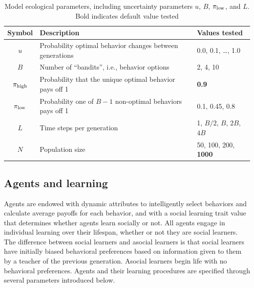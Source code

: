 \documentclass[letterpaper,11.5pt]{scrartcl}
\begin{document}
\vspace{2em}
\begin{table}[h]
\caption{Model ecological parameters, including uncertainty parameters $u$, $B$,
$\pi_{\mathrm{low}}$, and $L$. Bold indicates default value tested} %
    \label{tab:uncertaintyParameters}
    \centering %
    \begin{tabular}{cp{4.0in}p{1.25in}} \toprule

        Symbol & Description & Values tested \\ 

        \midrule  

        $u$    & Probability optimal behavior changes between generations 
               & 0.0, 0.1, \ldots, 1.0 \\

        $B$       & Number of ``bandits'', i.e., behavior options
                  & 2, 4, 10 \\

        $\pi_{\mathrm{high}}$ & Probability that the unique optimal behavior pays off 1 
                & \textbf{0.9} \\

        $\pi_{\mathrm{low}}$ & Probability one of $B - 1$ non-optimal behaviors pays off 1 
                 & 0.1, 0.45, 0.8 \\ 

        $L$    & Time steps per generation & 1, $B/2$, $B$, $2B$, $4B$ \\

        $N$    & Population size
                 & 50, 100, 200, \textbf{1000} \\
               
        \bottomrule
        \end{tabular} 
\end{table}



\subsection{Agents and learning}

Agents are endowed with dynamic attributes to intelligently select behaviors and
calculate average payoffs for each behavior, and with a social learning trait value
that determines whether agents learn socially or not. All agents engage in
individual learning over their lifespan, whether or not they are social learners.
The difference between social learners and asocial learners is that social learners
have initially biased behavioral preferences based on information given to them by a
teacher of the previous generation. Asocial learners begin life with no behavioral
preferences. Agents and their learning procedures are specified through several
parameters introduced below.
\end{document}
